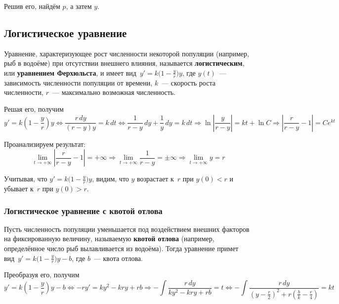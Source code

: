 Решив его, найдём $p$, а затем $y$.

\subsection{Логистическое уравнение}
  Уравнение, характеризующее рост численности некоторой популяции (например, рыб в водоёме) при отсутствии внешнего влияния, называется \textbf{логистическим}, или \textbf{уравнением Ферхюльста}, и имеет вид~$y' = k \bigl( 1 - \frac{y}r \bigr) y$, где $y(t)$~--- зависимость численности популяции от времени, $k$~--- скорость роста численности, $r$~--- максимально возможная численность.

Решая его, получим
\begin{equation*}
y' = k(1 - \frac{y}r)y \Leftrightarrow
\frac{r\,dy}{(r - y)y} = k\,dt \Leftrightarrow
\frac1{r - y}\,dy + \frac1y\,dy = k\,dt \Rightarrow
\ln \left| \frac{y}{r - y} \right| = kt + \ln C \Rightarrow
\left| \frac{r}{r - y} - 1 \right| = C e^{kt}
\end{equation*}

Проанализируем результат:
\begin{equation*}
\lim_{t \to +\infty} \left| \frac{r}{r - y} - 1 \right| = +\infty \Rightarrow
\lim_{t \to +\infty} \frac1{r - y} = \pm\infty \Rightarrow
\lim_{t \to +\infty} y = r
\end{equation*}

Учитывая, что $y' = k \bigl( 1 - \frac{y}r \bigr) y$, видим, что $y$ возрастает к~$r$ при $y(0) < r$ и убывает к~$r$ при $y(0) > r$.

\subsubsection{Логистическое уравнение с квотой отлова}
Пусть численность популяции уменьшается под воздействием внешних факторов на фиксированную величину, называемую \textbf{квотой отлова} (например, определённое число рыб вылавливается из водоёма).
Тогда уравнение примет вид~$y' = k \bigl( 1 - \frac{y}r \bigr) y - b$, где $b$~--- квота отлова.

Преобразуя его, получим
\begin{equation*}
y' = k \left( 1 - \frac{y}r \right) y - b \Leftrightarrow
-ry' = ky^2 - kry + rb \Rightarrow
-\int \frac{r\,dy}{ky^2 - kry + rb} = t \Leftrightarrow
-\int \frac{r\,dy}{\left( y - \frac{r}2 \right)^2 + r\left( \frac{b}k - \frac{r}4 \right)} = kt
\end{equation*}

